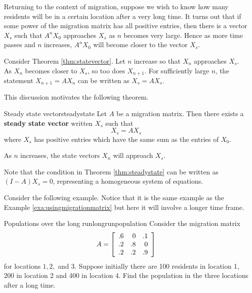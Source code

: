 Returning to the context of migration, suppose we wish to know how many residents will be in a certain location
after a very long time. It turns out that if some power of the
migration matrix has all positive entries, then there is a vector $X_s$ such that $A^{n}X_{0}$ approaches $X_s$ as $n$ becomes very large. Hence as more time passes and $n$ increases, $A^{n}X_{0}$ will become closer to the vector $X_s$. 

Consider Theorem \ref{thm:statevector}. Let $n$ increase so that $X_n$ approaches $X_s$. As $X_n$ becomes closer to $X_s$, so too does $X_{n+1}$. For sufficiently large $n$, the statement $X_{n+1} = AX_n$ can be written as $X_s = AX_s$. 

This discussion motivates the following theorem.

\begin{theorem}{Steady state vector}{steadystate}
Let $A$ be a migration matrix. Then there exists a \textbf{steady state vector} written $X_s$ such that 
\[
X_s = AX_s
\]
where $X_s$ has positive entries which have the same sum as the entries of $X_0$. 

As $n$ increases, the state vectors $X_n$ will approach $X_s$. 
\end{theorem}

Note that the condition in Theorem \ref{thm:steadystate} can be written as $(I - A)X_s=0$, representing a homogeneous system of equations. 

Consider the following example. Notice that it is the same example as the Example \ref{exa:usingmigrationmatrix} but here it will
involve a longer time frame.

\begin{example}{Populations over the long run}{longrunpopulation}
Consider the migration matrix 
\begin{equation*}
A
=
\left[
\begin{array}{rrr}
.6 & 0 & .1 \\
.2 & .8 & 0 \\
.2 & .2 & .9
\end{array}
\right] 
\end{equation*}
 for locations $1,2,$ and $3.$ Suppose initially there are 100
residents in location 1, 200 in location 2 and 400 in location 4. Find the
population in the three locations after a long time.
\end{example}

